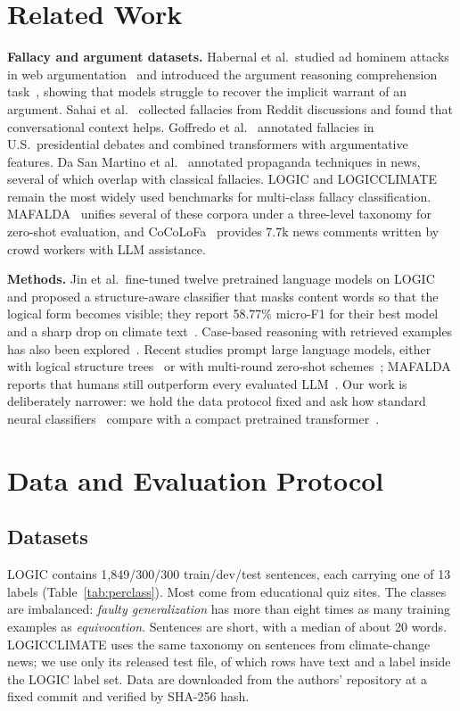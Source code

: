 \documentclass[conference]{IEEEtran}
\begin{document}
\section{Related Work}
\textbf{Fallacy and argument datasets.} Habernal et al.\ studied ad hominem attacks in web argumentation~\cite{habernal2018adhominem} and introduced the argument reasoning comprehension task~\cite{habernal2018arct}, showing that models struggle to recover the implicit warrant of an argument. Sahai et al.~\cite{sahai2021reddit} collected fallacies from Reddit discussions and found that conversational context helps. Goffredo et al.~\cite{goffredo2022political} annotated fallacies in U.S.\ presidential debates and combined transformers with argumentative features. Da San Martino et al.~\cite{dasanmartino2019propaganda} annotated propaganda techniques in news, several of which overlap with classical fallacies. LOGIC and LOGICCLIMATE~\cite{jin2022logical} remain the most widely used benchmarks for multi-class fallacy classification. MAFALDA~\cite{helwe2024mafalda} unifies several of these corpora under a three-level taxonomy for zero-shot evaluation, and CoCoLoFa~\cite{yeh2024cocolofa} provides 7.7k news comments written by crowd workers with LLM assistance.

\textbf{Methods.} Jin et al.\ fine-tuned twelve pretrained language models on LOGIC and proposed a structure-aware classifier that masks content words so that the logical form becomes visible; they report 58.77\% micro-F1 for their best model and a sharp drop on climate text~\cite{jin2022logical}. Case-based reasoning with retrieved examples has also been explored~\cite{sourati2023case}. Recent studies prompt large language models, either with logical structure trees~\cite{lei2024logicaltree} or with multi-round zero-shot schemes~\cite{pan2024zeroshot}; MAFALDA reports that humans still outperform every evaluated LLM~\cite{helwe2024mafalda}. Our work is deliberately narrower: we hold the data protocol fixed and ask how standard neural classifiers~\cite{kim2014cnn,hochreiter1997lstm,bahdanau2015attention} compare with a compact pretrained transformer~\cite{vaswani2017attention,devlin2019bert,sanh2019distilbert}.

\section{Data and Evaluation Protocol}

\subsection{Datasets}
LOGIC contains 1{,}849/300/300 train/dev/test sentences, each carrying one of 13 labels (Table~\ref{tab:perclass}). Most come from educational quiz sites. The classes are imbalanced: \emph{faulty generalization} has more than eight times as many training examples as \emph{equivocation}. Sentences are short, with a median of about 20 words. LOGICCLIMATE uses the same taxonomy on sentences from climate-change news; we use only its released test file, of which \nClimate{} rows have text and a label inside the LOGIC label set. Data are downloaded from the authors' repository at a fixed commit and verified by SHA-256 hash.
\end{document}

